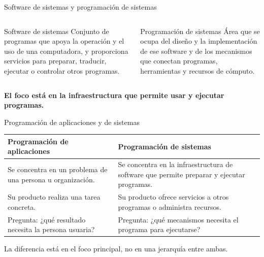 \documentclass[11pt,spanish]{beamer}
\newcommand{\term}[1]{\textbf{\textcolor{indiagreen!80!black}{#1}}}
\begin{document}
\begin{frame}{Software de sistemas y programación de sistemas}
\vfill

\begin{columns}[T,onlytextwidth]
\begin{column}{.48\textwidth}
\begin{block}{Software de sistemas}
\small
Conjunto de programas que apoya la operación y el uso de una computadora, y proporciona servicios para preparar, traducir, ejecutar o controlar otros programas.
\end{block}
\end{column}
\begin{column}{.48\textwidth}
\begin{block}{Programación de sistemas}
\small
Área que se ocupa del diseño y la implementación de ese software y de los mecanismos que conectan programas, herramientas y recursos de cómputo.
\end{block}
\end{column}
\end{columns}

\bigskip

\begin{center}
\term{El foco está en la infraestructura que permite usar y ejecutar programas.}
\end{center}

\vfill
\end{frame}

\begin{frame}{Programación de aplicaciones y de sistemas}
\vfill

\begin{center}
\small
\renewcommand{\arraystretch}{1.25}
\begin{tabular}{|L{.42\textwidth}|L{.42\textwidth}|}
\hline
\textbf{Programación de aplicaciones} & \textbf{Programación de sistemas} \tabularnewline
\hline
Se concentra en un problema de una persona u organización. & Se concentra en la infraestructura de software que permite preparar y ejecutar programas. \tabularnewline
\hline
Su producto realiza una tarea concreta. & Su producto ofrece servicios a otros programas o administra recursos. \tabularnewline
\hline
Pregunta: ¿qué resultado necesita la persona usuaria? & Pregunta: ¿qué mecanismos necesita el programa para ejecutarse? \tabularnewline
\hline
\end{tabular}
\end{center}

\bigskip

\begin{center}
\small La diferencia está en el foco principal, no en una jerarquía entre ambas.
\end{center}

\vfill
\end{frame}
\end{document}
